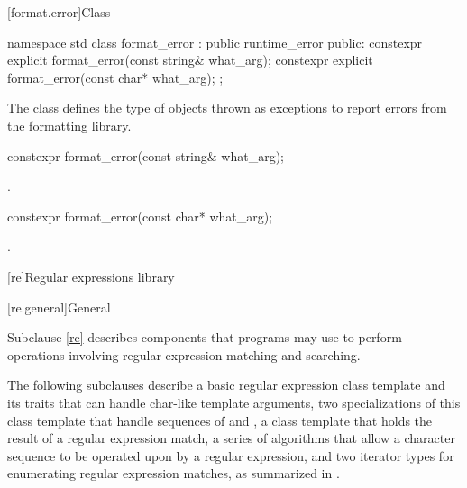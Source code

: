 [format.error]{Class }

%
\begin{codeblock}
namespace std {
  class format_error : public runtime_error {
  public:
    constexpr explicit format_error(const string& what_arg);
    constexpr explicit format_error(const char* what_arg);
  };
}
\end{codeblock}

\pnum
The class  defines the type of objects thrown as
exceptions to report errors from the formatting library.

%
\begin{itemdecl}
constexpr format_error(const string& what_arg);
\end{itemdecl}

\begin{itemdescr}
\pnum
\ensures
{}.

%
\end{itemdescr}
\begin{itemdecl}
constexpr format_error(const char* what_arg);
\end{itemdecl}

\begin{itemdescr}
\pnum
\ensures
{}.
\end{itemdescr}

[re]{Regular expressions library}

[re.general]{General}

\pnum
Subclause \ref{re} describes components that \Cpp{} programs may use to
perform operations involving regular expression matching and
searching.

\pnum
The following subclauses describe a basic regular expression class template and its
traits that can handle char-like template arguments,
two specializations of this class template that handle sequences of  and ,
a class template that holds the
result of a regular expression match, a series of algorithms that allow a character
sequence to be operated upon by a regular expression,
and two iterator types for
enumerating regular expression matches, as summarized in .

